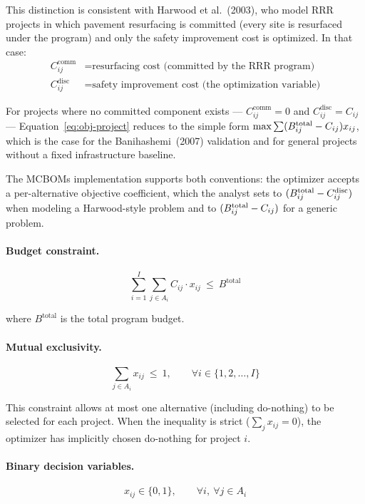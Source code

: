 This distinction is consistent with Harwood et al.~(2003), who model
RRR projects in which pavement resurfacing is committed (every site is
resurfaced under the program) and only the safety improvement cost is
optimized. In that case:
\begin{align*}
C_{ij}^{\mathrm{comm}} &= \text{resurfacing cost (committed by the RRR program)} \\
C_{ij}^{\mathrm{disc}} &= \text{safety improvement cost (the optimization variable)}
\end{align*}

For projects where no committed component exists ---
$C_{ij}^{\mathrm{comm}} = 0$ and $C_{ij}^{\mathrm{disc}} = C_{ij}$ ---
Equation~\ref{eq:obj-project} reduces to the simple form
$\max \sum (B^{\mathrm{total}}_{ij} - C_{ij}) x_{ij}$, which is the case for the
Banihashemi~(2007) validation and for general projects without a fixed
infrastructure baseline.

The MCBOMs implementation supports both conventions: the optimizer
accepts a per-alternative objective coefficient, which the analyst sets
to $(B^{\mathrm{total}}_{ij} - C_{ij}^{\mathrm{disc}})$ when modeling a Harwood-style
problem and to $(B^{\mathrm{total}}_{ij} - C_{ij})$ for a generic problem.

\paragraph{Budget constraint.}
\begin{equation}
\sum_{i=1}^{I} \sum_{j \in A_i} C_{ij} \cdot x_{ij}\ \leq\ B^{\mathrm{total}}
\label{eq:budget-project}
\end{equation}

\noindent where $B^{\mathrm{total}}$ is the total program budget.

\paragraph{Mutual exclusivity.}
\begin{equation}
\sum_{j \in A_i} x_{ij}\ \leq\ 1, \qquad \forall i \in \{1, 2, \ldots, I\}
\label{eq:mutex}
\end{equation}

This constraint allows at most one alternative (including do-nothing) to be
selected for each project. When the inequality is strict ($\sum_j x_{ij} = 0$),
the optimizer has implicitly chosen do-nothing for project $i$.

\paragraph{Binary decision variables.}
\begin{equation}
x_{ij} \in \{0, 1\}, \qquad \forall i,\ \forall j \in A_i
\label{eq:binary-project}
\end{equation}

